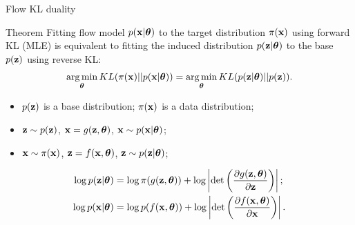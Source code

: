 \begin{frame}{Flow KL duality}
	\begin{block}{Theorem}
		Fitting flow model $p(\mathbf{x}| \boldsymbol{\theta})$ to the target distribution $\pi(\mathbf{x})$ using forward KL (MLE) is equivalent to fitting the induced distribution $p(\mathbf{z}| \boldsymbol{\theta})$ to the base $p(\mathbf{z})$ using reverse KL:
		\[
			\operatorname*{arg\,min}_{\boldsymbol{\theta}} KL(\pi(\mathbf{x}) || p(\mathbf{x} | \boldsymbol{\theta})) = \operatorname*{arg\,min}_{\boldsymbol{\theta}} KL(p(\mathbf{z} | \boldsymbol{\theta}) || p(\mathbf{z})).
		\]
		\vspace{-0.3cm}
		\begin{itemize}
			\item $p(\mathbf{z})$ is a base distribution; $\pi(\mathbf{x})$ is a data distribution;
			\item $\mathbf{z} \sim p(\mathbf{z})$, $\mathbf{x} = g(\mathbf{z}, \boldsymbol{\theta})$, $\mathbf{x} \sim p(\mathbf{x}| \boldsymbol{\theta})$;
			\item $\mathbf{x} \sim \pi(\mathbf{x})$, $\mathbf{z} = f(\mathbf{x}, \boldsymbol{\theta})$, $\mathbf{z} \sim p(\mathbf{z} | \boldsymbol{\theta})$;
		\end{itemize}
		\vspace{-0.3cm}
		\begin{align*}
			\log p(\mathbf{z} | \boldsymbol{\theta}) &= \log \pi(g(\mathbf{z}, \boldsymbol{\theta})) + \log \left| \det \left( \frac{\partial g(\mathbf{z}, \boldsymbol{\theta})}{\partial \mathbf{z}}\right) \right|; \\
			\log p(\mathbf{x} | \boldsymbol{\theta}) &= \log p(f(\mathbf{x}, \boldsymbol{\theta})) + \log \left| \det \left( \frac{\partial f(\mathbf{x}, \boldsymbol{\theta})}{\partial \mathbf{x}}\right) \right|.
		\end{align*}
	\end{block}
\end{frame}
